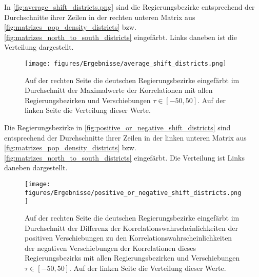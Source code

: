 In \autoref{fig:average_shift_districts.png} sind die Regierungsbezirke entsprechend der Durchschnitte ihrer Zeilen in der rechten unteren Matrix aus \autoref{fig:matrizes_pop_density_districts} bzw. \autoref{fig:matrizes_north_to_south_districts} eingefärbt. Links daneben ist die Verteilung dargestellt.

\begin{figure}[H]
    \centering
    \texttt{[image: figures/Ergebnisse/average\_shift\_districts.png]}
    \caption{Auf der rechten Seite die deutschen Regierungsbezirke eingefärbt im Durchschnitt der Maximalwerte der Korrelationen mit allen Regierungsbezirken und Verschiebungen $\tau\in[-50,50]$. Auf der linken Seite die Verteilung dieser Werte.}
    \label{fig:average_shift_districts.png}
\end{figure}

Die Regierungsbezirke in \autoref{fig:positive_or_negative_shift_districts} sind  entsprechend der Durchschnitte ihrer Zeilen in der linken unteren Matrix aus \autoref{fig:matrizes_pop_density_districts} bzw. \autoref{fig:matrizes_north_to_south_districts} eingefärbt. Die Verteilung ist Links daneben dargestellt.

\begin{figure}[H]
    \centering
    \texttt{[image: figures/Ergebnisse/positive\_or\_negative\_shift\_districts.png]}
    \caption{Auf der rechten Seite die deutschen Regierungsbezirke eingefärbt im Durchschnitt der Differenz der Korrelationswahrscheinlichkeiten der positiven Verschiebungen zu den Korrelationswahrscheinlichkeiten der negativen Verschiebungen der Korrelationen dieses Regierungsbezirks mit allen Regierungsbezirken und Verschiebungen $\tau\in[-50,50]$. Auf der linken Seite die Verteilung dieser Werte.}
    \label{fig:positive_or_negative_shift_districts}
\end{figure}

